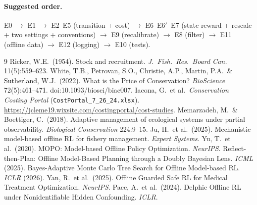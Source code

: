 \documentclass[11pt]{article}
\newcommand{\code}[1]{\texttt{#1}}
\begin{document}
\paragraph{Suggested order.} E0 $\to$ E1 $\to$ E2--E5 (transition + cost) $\to$
E6--E6$'$--E7 (state reward + rescale + two settings + conventions) $\to$
E9 (recalibrate) $\to$ E8 (filter) $\to$ E11 (offline data) $\to$ E12 (logging) $\to$
E10 (tests).

\begin{thebibliography}{9}
 Ricker, W.E.\ (1954). Stock and recruitment. \emph{J.\ Fish.\ Res.\ Board Can.} 11(5):559--623.
 White, T.B., Petrovan, S.O., Christie, A.P., Martin, P.A.\ \& Sutherland, W.J.\ (2022). What is the Price of Conservation? \emph{BioScience} 72(5):461--471. doi:10.1093/biosci/biac007.
 Iacona, G.\ et al.\ \emph{Conservation Costing Portal} (\code{CostPortal\_7\_26\_24.xlsx}). \url{https://jcleme19.wixsite.com/costingportal/cost-studies}.
 Memarzadeh, M.\ \& Boettiger, C.\ (2018). Adaptive management of ecological systems under partial observability. \emph{Biological Conservation} 224:9--15.
 Ju, H.\ et al.\ (2025). Mechanistic model-based offline RL for fishery management. \emph{Expert Systems}.
 Yu, T.\ et al.\ (2020). MOPO: Model-based Offline Policy Optimization. \emph{NeurIPS}.
 Reflect-then-Plan: Offline Model-Based Planning through a Doubly Bayesian Lens. \emph{ICML} (2025).
 Bayes-Adaptive Monte Carlo Tree Search for Offline Model-based RL. \emph{ICLR} (2026).
 Yan, R.\ et al.\ (2025). Offline Guarded Safe RL for Medical Treatment Optimization. \emph{NeurIPS}.
 Pace, A.\ et al.\ (2024). Delphic Offline RL under Nonidentifiable Hidden Confounding. \emph{ICLR}.
\end{thebibliography}
\end{document}

